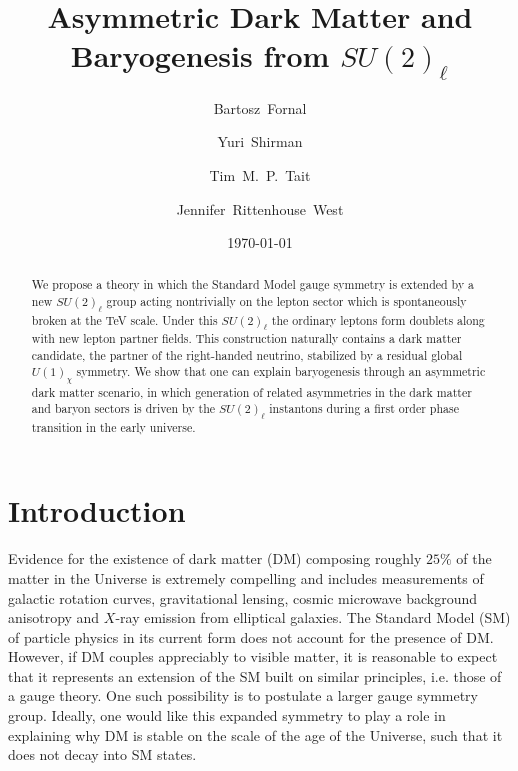\documentclass[prd,showpcs,amsmath,amssymb,nofootinbib,preprintnumbers,balancelastpage,longbibliography,superscriptaddress,notitlepage]{revtex4}
\begin{document}

\title{Asymmetric Dark Matter and Baryogenesis from $SU(2)_\ell$}

\author{Bartosz~Fornal}
\author{Yuri~Shirman}
\author{Tim~M.~P.~Tait}
\author{Jennifer~Rittenhouse~West}
\date{\today}

\begin{abstract}
We propose a theory in which the Standard Model gauge symmetry is extended by a new $SU(2)_\ell$ group acting nontrivially on the lepton sector which is
spontaneously broken at the TeV scale. Under this $SU(2)_\ell$ the ordinary leptons form doublets along with new lepton partner fields. This construction naturally contains a dark matter candidate, the partner of the right-handed neutrino, stabilized by a residual global $U(1)_\chi$ symmetry. We show that one can explain baryogenesis through
an asymmetric dark matter scenario, in which generation of related asymmetries in the dark matter and baryon sectors is driven by the $SU(2)_\ell$ instantons during a first order phase transition in the early universe. 
\vspace{11mm}
\end{abstract}

\maketitle

\section{Introduction}

Evidence for the existence of dark matter (DM) composing roughly $25\%$ of the matter in the Universe is extremely compelling and includes measurements of galactic rotation curves, gravitational lensing, cosmic microwave background anisotropy and $X$-ray emission from elliptical galaxies. The Standard Model (SM) of particle physics in its current form does not account for the presence of DM. However, if DM couples appreciably to visible matter, it is reasonable to expect that it represents an extension of the SM built on similar principles, i.e. those of a gauge theory. One such possibility is to postulate  a larger gauge symmetry group.  Ideally, one would like this expanded symmetry
to play a role in explaining why DM is stable on the scale of the age of the Universe, such that it does not decay into SM states.
\end{document}
